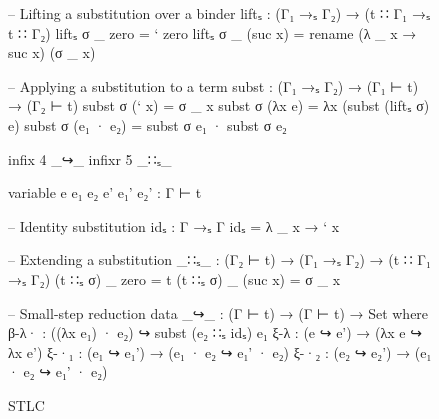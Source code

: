 \begin{figure}[b!]
{\begin{minipage}{0.67\linewidth}
\begin{code}
  -- Lifting a substitution over a binder
  liftₛ : (Γ₁ →ₛ Γ₂) → (t ∷ Γ₁ →ₛ t ∷ Γ₂)
  liftₛ σ _ zero     = ` zero
  liftₛ σ _ (suc x)  = rename (λ _ x → suc x) (σ _ x)

  -- Applying a substitution to a term
  subst : (Γ₁ →ₛ Γ₂) → (Γ₁ ⊢ t) → (Γ₂ ⊢ t)
  subst σ (` x)      = σ _ x
  subst σ (λx e)     = λx (subst (liftₛ σ) e)
  subst σ (e₁ · e₂)  = subst σ e₁ · subst σ e₂
\end{code}
\begin{code}[hide]
  infix 4 _↪_
  infixr 5 _∷ₛ_

  variable e e₁ e₂ e' e₁' e₂' : Γ ⊢ t

  -- Identity substitution
  idₛ : Γ →ₛ Γ
  idₛ = λ _ x → ` x

  -- Extending a substitution
  _∷ₛ_ : (Γ₂ ⊢ t) → (Γ₁ →ₛ Γ₂) → (t ∷ Γ₁ →ₛ Γ₂)
  (t ∷ₛ σ) _ zero     = t
  (t ∷ₛ σ) _ (suc x)  = σ _ x

  -- Small-step reduction
  data _↪_ : (Γ ⊢ t) → (Γ ⊢ t) → Set where
    β-λ·  : ((λx e₁) · e₂) ↪ subst (e₂ ∷ₛ idₛ) e₁
    ξ-λ   : (e ↪ e') → (λx e ↪ λx e')
    ξ-·₁  : (e₁ ↪ e₁') → (e₁ · e₂ ↪ e₁' · e₂)
    ξ-·₂  : (e₂ ↪ e₂') → (e₁ · e₂ ↪ e₁' · e₂)
\end{code}
\end{minipage}
}
\caption{STLC}
\label{fig:stlc-intrinsic}
\end{figure}

